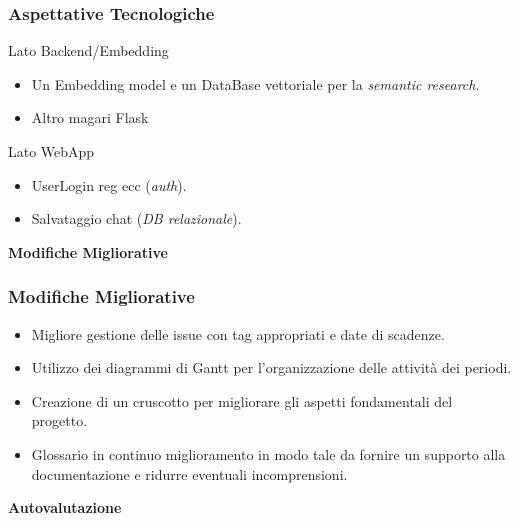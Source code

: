 \documentclass{beamer}
\begin{document}
\begin{frame}
    \frametitle{Aspettative Tecnologiche}
        \begin{block}{Lato Backend/Embedding}
                \begin{itemize}
                    \item Un Embedding model e un DataBase vettoriale per la \textit{semantic research}.
                    \item Altro magari Flask
                \end{itemize}
        \end{block}
        \begin{block}{Lato WebApp}
                \begin{itemize}
                    \item UserLogin reg ecc (\textit{auth}).
                    \item Salvataggio chat (\textit{DB relazionale}).
                \end{itemize}
        \end{block}
\end{frame}

\begin{frame}
    \centering
    \vspace*{2cm}
    {\Huge \textbf{Modifiche Migliorative}}
    \vspace*{2cm}
\end{frame}

\begin{frame}
    \frametitle{Modifiche Migliorative}
    \begin{itemize}
        \item Migliore gestione delle issue con tag appropriati e date di scadenze.
        \item Utilizzo dei diagrammi di Gantt per l'organizzazione delle attività dei periodi.
        \item Creazione di un cruscotto per migliorare gli aspetti fondamentali del progetto.
        \item Glossario in continuo miglioramento in modo tale da fornire un supporto alla documentazione e ridurre eventuali incomprensioni.
    \end{itemize}
\end{frame}

\begin{frame}
    \centering
    \vspace*{2cm}
    {\Huge \textbf{Autovalutazione}}
    \vspace*{2cm}
\end{frame}
\end{document}
